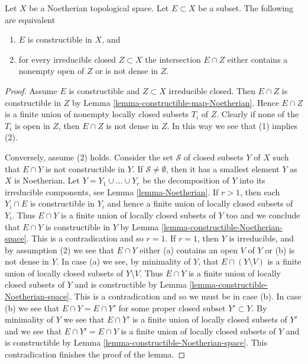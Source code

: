 \begin{lemma}
\label{lemma-characterize-constructible-Noetherian}
Let $X$ be a Noetherian topological space.
Let $E \subset X$ be a subset.
The following are equivalent
\begin{enumerate}
\item $E$ is constructible in $X$, and
\item for every irreducible closed $Z \subset X$ the intersection
$E \cap Z$ either contains a nonempty open of $Z$ or is not dense in $Z$.
\end{enumerate}
\end{lemma}

\begin{proof}
Assume $E$ is constructible and $Z \subset X$ irreducible closed.
Then $E \cap Z$ is constructible in $Z$ by
Lemma \ref{lemma-constructible-map-Noetherian}.
Hence $E \cap Z$ is a finite union of nonempty locally closed subsets
$T_i$ of $Z$. Clearly if none of the $T_i$ is open in $Z$, then
$E \cap Z$ is not dense in $Z$. In this way we see that (1) implies (2).

\medskip\noindent
Conversely, assume (2) holds. Consider the set $\mathcal{S}$ of closed
subsets $Y$ of $X$ such that $E \cap Y$ is not constructible in $Y$.
If $\mathcal{S} \not = \emptyset$, then it has a smallest element $Y$
as $X$ is Noetherian.
Let $Y = Y_1 \cup \ldots \cup Y_r$ be the decomposition of $Y$ into its
irreducible components, see
Lemma \ref{lemma-Noetherian}.
If $r > 1$, then each $Y_i \cap E$ is constructible in $Y_i$ and hence
a finite union of locally closed subsets of $Y_i$. Thus $E \cap Y$
is a finite union of locally closed subsets of $Y$ too and we conclude
that $E \cap Y$ is constructible in $Y$ by
Lemma \ref{lemma-constructible-Noetherian-space}.
This is a contradication and so $r = 1$. If $r = 1$, then $Y$ is
irreducible, and by assumption (2) we see that $E \cap Y$ either
(a) contains an open $V$ of $Y$ or (b) is not dense in $Y$.
In case (a) we see, by minimality of $Y$, that $E \cap (Y \setminus V)$
is a finite union of locally closed subsets of $Y \setminus V$. Thus
$E \cap Y$ is a finite union of locally closed subsets of $Y$ and is
constructible by
Lemma \ref{lemma-constructible-Noetherian-space}.
This is a contradication and so we must be in case (b).
In case (b) we see that $E \cap Y = E \cap Y'$ for some proper closed
subset $Y' \subset Y$. By minimality of $Y$ we see that
$E \cap Y'$ is a finite union of locally closed subsets of $Y'$ and
we see that $E \cap Y' = E \cap Y$ is a finite union of locally closed
subsets of $Y$ and is constructible by
Lemma \ref{lemma-constructible-Noetherian-space}.
This contradication finishes the proof of the lemma.
\end{proof}

